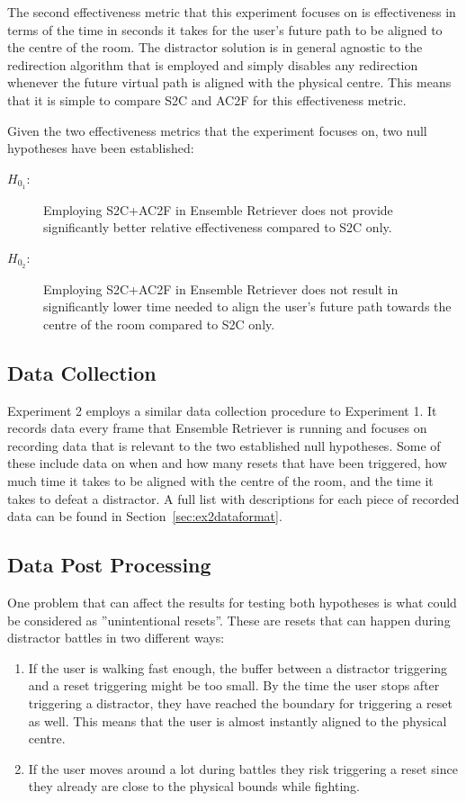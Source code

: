 The second effectiveness metric that this experiment focuses on is effectiveness in terms of the time in seconds it takes for the user's future path to be aligned to the centre of the room. The distractor solution is in general agnostic to the redirection algorithm that is employed and simply disables any redirection whenever the future virtual path is aligned with the physical centre. This means that it is simple to compare S2C and AC2F for this effectiveness metric.

Given the two effectiveness metrics that the experiment focuses on, two null hypotheses have been established:
\begin{description}
  \item[$H_{0_1}$:] Employing S2C+AC2F in Ensemble Retriever does not provide significantly better relative effectiveness compared to S2C only. 
  \item[$H_{0_2}$:] Employing S2C+AC2F in Ensemble Retriever does not result in significantly lower time needed to align the user's future path towards the centre of the room compared to S2C only.
\end{description}


\subsection{Data Collection}
Experiment 2 employs a similar data collection procedure to Experiment 1. It records data every frame that Ensemble Retriever is running and focuses on recording data that is relevant to the two established null hypotheses. Some of these include data on when and how many resets that have been triggered, how much time it takes to be aligned with the centre of the room, and the time it takes to defeat a distractor. A full list with descriptions for each piece of recorded data can be found in Section~\ref{sec:ex2dataformat}. 

\subsection{Data Post Processing}\label{sec:ex2postprocessing}
One problem that can affect the results for testing both hypotheses is what could be considered as ''unintentional resets''. These are resets that can happen during distractor battles in two different ways:
\begin{enumerate}
    \item If the user is walking fast enough, the buffer between a distractor triggering and a reset triggering might be too small. By the time the user stops after triggering a distractor, they have reached the boundary for triggering a reset as well. This means that the user is almost instantly aligned to the physical centre. 
    \item If the user moves around a lot during battles they risk triggering a reset since they already are close to the physical bounds while fighting. 
\end{enumerate}

